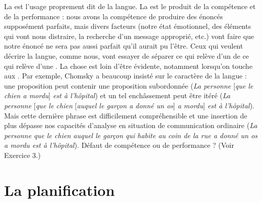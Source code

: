 {    La  est l’usage proprement dit de la langue. La  est le produit de la compétence et de la performance : nous avons la compétence de produire des énoncés supposément parfaits, mais divers facteurs (notre état émotionnel, des éléments qui vont nous distraire, la recherche d’un message approprié, etc.) vont faire que notre énoncé ne sera pas aussi parfait qu’il aurait pu l’être. Ceux qui veulent décrire la langue, comme nous, vont essayer de séparer ce qui relève d’un  de ce qui relève d’une . La chose est loin d’être évidente, notamment lorsqu’on touche aux . Par exemple, Chomsky a beaucoup insisté sur le caractère  de la langue : une proposition peut contenir une proposition subordonnée (\textit{La personne} [\textit{que le chien a mordu}] \textit{est à l’hôpital}) et un tel enchâssement peut être itéré (\textit{La personne} [\textit{que le chien} [\textit{auquel le garçon a donné un os}] \textit{a mordu}] \textit{est à l’hôpital}). Mais cette dernière phrase est difficilement compréhensible et une insertion de plus dépasse nos capacités d’analyse en situation de communication ordinaire (\textit{La personne que le chien auquel le garçon qui habite au coin de la rue a donné un os a mordu est à l’hôpital}). Défaut de compétence ou de performance ? (Voir Exercice 3.)
}
\section{La planification}\label{sec:1.1.9}

